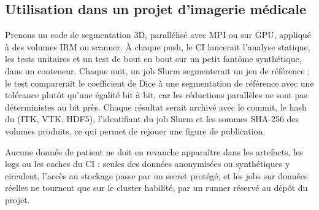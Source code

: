\documentclass[11pt,a4paper]{article}
\newcommand{\fic}[1]{\code{#1}}
\begin{document}
{{{{{{{\subsection{Utilisation dans un projet d'imagerie médicale}

Prenons un code de segmentation 3D, parallélisé avec MPI ou sur GPU, appliqué à des volumes IRM
ou scanner. À chaque push, le CI lancerait l'analyse statique, les tests unitaires et un test de
bout en bout sur un petit fantôme synthétique, dans un conteneur. Chaque nuit, un job Slurm
segmenterait un jeu de référence ; le test comparerait le coefficient de Dice à une segmentation
de référence avec une tolérance plutôt qu'une égalité bit à bit, car les réductions parallèles ne
sont pas déterministes au bit près. Chaque résultat serait archivé avec le commit, le hash du
\fic{spack.lock} (ITK, VTK, HDF5), l'identifiant du job Slurm et les sommes SHA-256 des volumes
produits, ce qui permet de rejouer une figure de publication.

Aucune donnée de patient ne doit en revanche apparaître dans les artefacts, les logs ou les
caches du CI : seules des données anonymisées ou synthétiques y circulent, l'accès au stockage
passe par un secret protégé, et les jobs sur données réelles ne tournent que sur le cluster
habilité, par un runner réservé au dépôt du projet.

\clearpage
}}}}}}}
\end{document}
